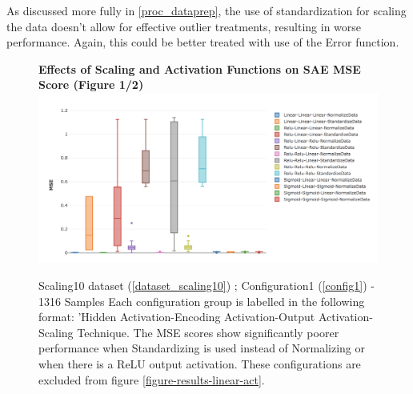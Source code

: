 \documentclass[a4paper,11pt,oneside]{article}
\theoremstyle{plain}
\theoremstyle{definition}
\begin{document}
As discussed more fully in \ref{proc_dataprep}, the use of standardization for scaling the data doesn't allow for effective outlier treatments, resulting in worse performance. Again, this could be better treated with use of the Error function. \newline

\begin{figure}[H]
	\centering
		\textbf{Effects of Scaling and Activation Functions on SAE MSE Score (Figure 1/2)}
		\includegraphics[scale=0.4]{images/results/linearity/0Scaling_and_Activation_Combos_Min_MSE.png}
		\caption{Scaling10 dataset (\ref{dataset_scaling10}) ; Configuration1 (\ref{config1}) - 1316 Samples
			\newline \newline Each configuration group is labelled in the following format: 'Hidden Activation-Encoding Activation-Output Activation-Scaling Technique. The MSE scores show significantly poorer performance when Standardizing is used instead of Normalizing or when there is a ReLU output activation. These configurations are excluded from figure \ref{figure-results-linear-act}.}
		\label{figure-results-scaling-and-relu}
\end{figure}
\end{document}
